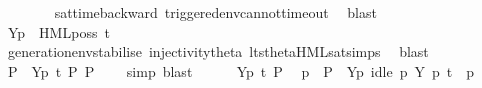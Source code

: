 \begin{isabellebody}
\ \ \ \ \ \ \isamarkupfalse%
\ sat{\isacharunderscore}{\kern0pt}time{\isacharunderscore}{\kern0pt}backward\ triggered{\isacharunderscore}{\kern0pt}env{\isacharunderscore}{\kern0pt}cannot{\isacharunderscore}{\kern0pt}timeout\ \isamarkupfalse%
\ blast{\isacharplus}{\kern0pt}\isanewline
\ \ \ \ \isamarkupfalse%
\ {\isacartoucheopen}{\isasymtheta}{\isacharbrackleft}{\kern0pt}Y{\isacharbrackright}{\kern0pt}{\isacharparenleft}{\kern0pt}p{\isacharparenright}{\kern0pt}\ {\isasymTurnstile}\ HML{\isacharunderscore}{\kern0pt}poss\ t\ {\isasymsigma}{\isacharparenleft}{\kern0pt}{\isasymphi}{\isacharparenright}{\kern0pt}{\isacartoucheclose}\isanewline
\ \ \ \ \ \ \isamarkupfalse%
\ generation{\isacharunderscore}{\kern0pt}env{\isacharunderscore}{\kern0pt}stabilise\ injectivity{\isacharunderscore}{\kern0pt}theta{\isacharparenleft}{\kern0pt}{}{\isacharparenright}{\kern0pt}\ lts{\isacharunderscore}{\kern0pt}theta{\isachardot}{\kern0pt}HML{\isacharunderscore}{\kern0pt}sat{\isachardot}{\kern0pt}simps{\isacharparenleft}{\kern0pt}{}{\isacharparenright}{\kern0pt}\ \isamarkupfalse%
\ blast\isanewline
\ \ \ \ \isamarkupfalse%
\ \isamarkupfalse%
\ P{\isacharprime}{\kern0pt}\ \ {\isacartoucheopen}{\isasymtheta}{\isacharbrackleft}{\kern0pt}Y{\isacharbrackright}{\kern0pt}{\isacharparenleft}{\kern0pt}p{\isacharparenright}{\kern0pt}\ {\isasymlongmapsto}\isactrlsup {\isasymtheta}t\ P{\isacharprime}{\kern0pt}{\isacartoucheclose}\ {\isacartoucheopen}P{\isacharprime}{\kern0pt}\ {\isasymTurnstile}\ {\isasymsigma}{\isacharparenleft}{\kern0pt}{\isasymphi}{\isacharparenright}{\kern0pt}{\isacartoucheclose}\ \isamarkupfalse%
\ {\isacharparenleft}{\kern0pt}simp{\isacharcomma}{\kern0pt}\ blast{\isacharparenright}{\kern0pt}\isanewline
\ \ \ \ \isamarkupfalse%
\ {\isacartoucheopen}{\isasymtheta}{\isacharbrackleft}{\kern0pt}Y{\isacharbrackright}{\kern0pt}{\isacharparenleft}{\kern0pt}p{\isacharparenright}{\kern0pt}\ {\isasymlongmapsto}\isactrlsup {\isasymtheta}t\ P{\isacharprime}{\kern0pt}{\isacartoucheclose}\ \isamarkupfalse%
\ p{\isacharprime}{\kern0pt}\ \ {\isacartoucheopen}P{\isacharprime}{\kern0pt}\ {\isacharequal}{\kern0pt}\ {\isasymtheta}{\isacharbrackleft}{\kern0pt}Y{\isacharbrackright}{\kern0pt}{\isacharparenleft}{\kern0pt}p{\isacharprime}{\kern0pt}{\isacharparenright}{\kern0pt}{\isacartoucheclose}\ {\isacartoucheopen}idle\ p\ Y{\isacartoucheclose}\ {\isacartoucheopen}p\ {\isasymlongmapsto}t\ \ p{\isacharprime}{\kern0pt}{\isacartoucheclose}\ \isanewline

\end{isabellebody}
